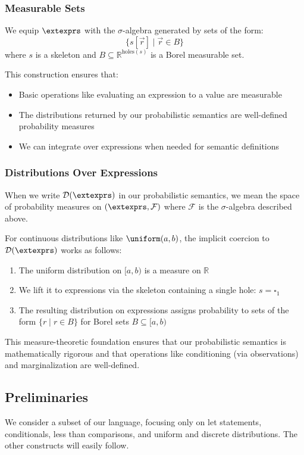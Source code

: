 \subsubsection{Measurable Sets}

We equip $\extexprs$ with the $\sigma$-algebra generated by sets of the form:
\[
\{s[\vec{r}] \mid \vec{r} \in B\}
\]
where $s$ is a skeleton and $B \subseteq \mathbb{R}^{\text{holes}(s)}$ is a Borel measurable set.

This construction ensures that:
\begin{itemize}
    \item Basic operations like evaluating an expression to a value are measurable
    \item The distributions returned by our probabilistic semantics are well-defined probability measures
    \item We can integrate over expressions when needed for semantic definitions
\end{itemize}

\subsubsection{Distributions Over Expressions}

When we write $\mathcal{D}(\extexprs)$ in our probabilistic semantics, we mean the space of probability measures on $(\extexprs, \mathcal{F})$ where $\mathcal{F}$ is the $\sigma$-algebra described above.

For continuous distributions like $\uniform(a, b)$, the implicit coercion to $\mathcal{D}(\extexprs)$ works as follows:
\begin{enumerate}
    \item The uniform distribution on $[a, b)$ is a measure on $\mathbb{R}$
    \item We lift it to expressions via the skeleton containing a single hole: $s = \square_1$
    \item The resulting distribution on expressions assigns probability to sets of the form $\{r \mid r \in B\}$ for Borel sets $B \subseteq [a, b)$
\end{enumerate}

This measure-theoretic foundation ensures that our probabilistic semantics is mathematically rigorous and that operations like conditioning (via observations) and marginalization are well-defined. 


\newpage
\subsection{Preliminaries}
We consider a subset of our language, focusing only on let statements, conditionals, less than comparisons, and uniform and discrete distributions. The other constructs will easily follow.

